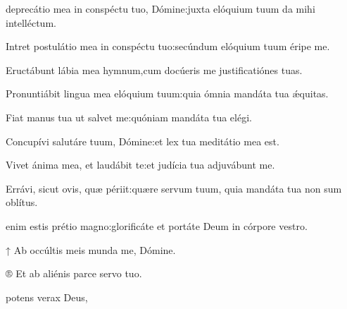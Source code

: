 \begin{multicols}{2}

\Normal

\vspace{-0.2cm}

 deprecátio mea in conspéctu tuo, Dómine\thinspace:\GreStarNbsp juxta elóquium tuum da mihi intelléctum.

Intret postulátio mea in conspéctu tuo\thinspace:\GreStarNbsp secúndum elóquium tuum éripe me.

Eructábunt lábia mea hymnum,\GreStarNbsp cum docúeris me justificatiónes tuas.

Pronuntiábit lingua mea elóquium tuum\thinspace:\GreStarNbsp quia ómnia mandáta tua ǽquitas.

Fiat manus tua ut salvet me\thinspace:\GreStarNbsp quóniam mandáta tua elégi.

Concupívi salutáre tuum, Dómine\thinspace:\GreStarNbsp et lex tua meditátio mea est.

Vivet ánima mea, et laudábit te\thinspace:\GreStarNbsp et judícia tua adjuvábunt me.

Errávi, sicut ovis, quæ périit\thinspace:\GreStarNbsp quære servum tuum, quia mandáta tua non sum oblítus.

\vspace{-0.4cm}


\vspace{-0.4cm}


 enim estis prétio magno\thinspace:\GreStarNbsp glo\-rificáte et portáte Deum in córpore vestro.

↑ Ab occúltis meis munda me, Dómine.

® Et ab aliénis parce servo tuo.



\Ligne


\vspace{-0.4cm}


\Hymne{}

\setlength{\leftskip}{0cm}
 potens verax Deus,


\end{multicols}
